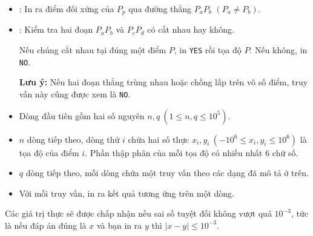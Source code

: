 \begin{itemize}
    \item {}: In ra điểm đối xứng của $P_p$ qua đường thẳng $P_aP_b$ $(P_a \ne P_b)$.

    \item {}: Kiểm tra hai đoạn $P_aP_b$ và $P_cP_d$ có cắt nhau hay không.
    
    Nếu chúng cắt nhau tại đúng một điểm $P$, in \texttt{YES} rồi tọa độ $P$.
    Nếu không, in \texttt{NO}.
    
    \textbf{Lưu ý:} Nếu hai đoạn thẳng trùng nhau hoặc chồng lấp trên vô số điểm,
    truy vấn này cũng được xem là \texttt{NO}.
\end{itemize}


\begin{itemize}
    \item Dòng đầu tiên gồm hai số nguyên $n, q\ (1 \le n, q \le 10^5)$.
    \item $n$ dòng tiếp theo, dòng thứ $i$ chứa hai số thực $x_i, y_i\ (-10^6 \le x_i,y_i \le 10^6)$ là tọa độ của điểm $i$. Phần thập phân của mỗi tọa độ có nhiều nhất $6$ chữ số.
    \item $q$ dòng tiếp theo, mỗi dòng chứa một truy vấn theo các dạng đã mô tả ở trên.
\end{itemize}

\outputDesc{}

\begin{itemize}
    \item Với mỗi truy vấn, in ra kết quả tương ứng trên một dòng.
\end{itemize}

Các giá trị thực sẽ được chấp nhận nếu sai số tuyệt đối không vượt quá $10^{-3}$,
tức là nếu đáp án đúng là $x$ và bạn in ra $y$ thì $|x-y| \le 10^{-3}$.

\vspace{0.5em}

